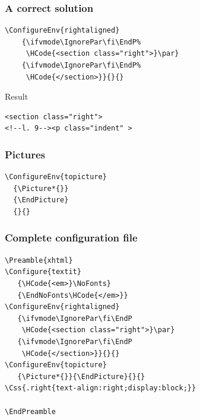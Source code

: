 \begin{frame}[fragile]
  \frametitle{A correct solution}
  \begin{priklad}
\begin{verbatim}
\ConfigureEnv{rightaligned}
    {\ifvmode\IgnorePar\fi\EndP%
     \HCode{<section class="right">}\par}
    {\ifvmode\IgnorePar\fi\EndP%
     \HCode{</section>}}{}{}
\end{verbatim}
  \end{priklad}

  Result

  \begin{verbatim}
<section class="right">
<!--l. 9--><p class="indent" >
  \end{verbatim}
\end{frame}

\begin{frame}[fragile]
  \frametitle{Pictures}
  \begin{priklad}
\begin{verbatim}
\ConfigureEnv{topicture}
  {\Picture*{}}
  {\EndPicture}
  {}{}
\end{verbatim}
\end{priklad}
\end{frame}

\begin{frame}[fragile]
  \frametitle{Complete configuration file}
    \small
    \begin{verbatim}
\Preamble{xhtml}
\Configure{textit}
   {\HCode{<em>}\NoFonts}
   {\EndNoFonts\HCode{</em>}}
\ConfigureEnv{rightaligned}
   {\ifvmode\IgnorePar\fi\EndP
    \HCode{<section class="right">}\par}
   {\ifvmode\IgnorePar\fi\EndP
    \HCode{</section>}}{}{}
\ConfigureEnv{topicture}
   {\Picture*{}}{\EndPicture}{}{}
\Css{.right{text-align:right;display:block;}}

\EndPreamble
  \end{verbatim}
\end{frame}

% 

